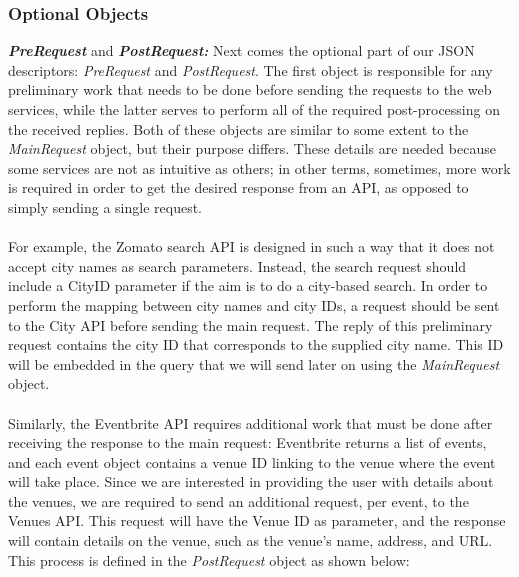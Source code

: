 \subsubsection{Optional Objects}
\textbf{\textit{PreRequest}} and \textbf{\textit{PostRequest:}} Next comes the optional part of our JSON descriptors: \emph{PreRequest} and \emph{PostRequest}. The first object is responsible for any preliminary work that needs to be done before sending the requests to the web services, while the latter serves to perform all of the required post-processing on the received replies. Both of these objects are similar to some extent to the \emph{MainRequest} object, but their purpose differs. These details are needed because some services are not as intuitive as others; in other terms, sometimes, more work is required in order to get the desired response from an API, as opposed to simply sending a single request.\\\\
For example, the Zomato search API is designed in such a way that it does not accept city names as search parameters. Instead, the search request should include a CityID parameter if the aim is to do a city-based search. In order to perform the mapping between city names and city IDs, a request should be sent to the City API before sending the main request. The reply of this preliminary request contains the city ID that corresponds to the supplied city name. This ID will be embedded in the query that we will send later on using the \emph{MainRequest} object.\\\\
Similarly, the Eventbrite API requires additional work that must be done after receiving the response to the main request: Eventbrite returns a list of events, and each event object contains a venue ID linking to the venue where the event will take place. Since we are interested in providing the user with details about the venues, we are required to send an additional request, per event, to the Venues API. This request will have the Venue ID as parameter, and the response will contain details on the venue, such as the venue's name, address, and URL. This process is defined in the \emph{PostRequest} object as shown below:
